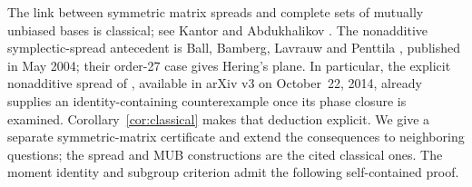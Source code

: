 \documentclass[11pt]{article}
\begin{document}
The link between symmetric matrix spreads and complete sets of mutually unbiased bases is classical; see Kantor \cite[Section 3, Eqs.~(3.1)--(3.3)]{kantor} and Abdukhalikov \cite[Section 3]{abdu}. The nonadditive symplectic-spread antecedent is Ball, Bamberg, Lavrauw and Penttila \cite[Section~1 and Theorem~2.2]{ball}, published in May 2004; their order-27 case gives Hering's plane. In particular, the explicit nonadditive spread of \cite[Section~3.3, Corollary~3.7]{abdu}, available in arXiv v3 on October~22, 2014, already supplies an identity-containing counterexample once its phase closure is examined. Corollary~\ref{cor:classical} makes that deduction explicit. We give a separate symmetric-matrix certificate and extend the consequences to neighboring questions; the spread and MUB constructions are the cited classical ones. The moment identity and subgroup criterion admit the following self-contained proof.
\end{document}

